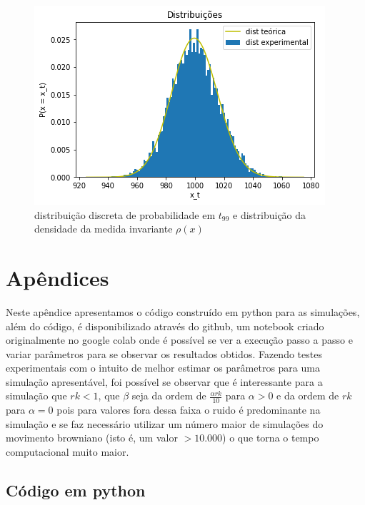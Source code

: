 \documentclass[12pt]{article}
\begin{document}
\begin{figure}[H]
 \centering
 \includegraphics[width=1.0\linewidth]{dist.png}
 \caption{distribuição discreta de probabilidade em $t_{99}$ e distribuição da densidade da medida invariante $\rho(x)$}
 \label{fig:dist}
\end{figure}



 
\section{Apêndices} 

Neste apêndice apresentamos o código construído em python para as simulações, além do código, é disponibilizado através do github, um notebook criado originalmente no google colab onde é possível se ver a execução passo a passo e variar parâmetros para se observar os resultados obtidos. Fazendo testes experimentais com o intuito de melhor estimar os parâmetros para uma simulação apresentável, foi possível se observar que é interessante para a simulação que $rk < 1$, que $\beta$ seja da ordem de $\frac{\alpha rk}{10}$ para $\alpha > 0$ e da ordem de $rk$ para $\alpha = 0$ pois para valores fora dessa faixa o ruido é predominante na simulação e se faz necessário utilizar um número maior de simulações do movimento browniano (isto é, um valor $>10.000$) o que torna o tempo computacional muito maior.


\subsection*{Código em python}
\end{document}
